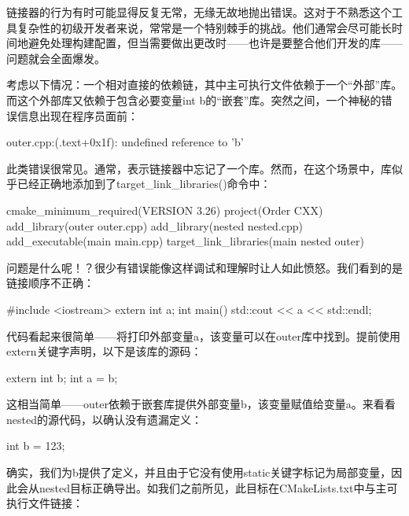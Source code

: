 
链接器的行为有时可能显得反复无常，无缘无故地抛出错误。这对于不熟悉这个工具复杂性的初级开发者来说，常常是一个特别棘手的挑战。他们通常会尽可能长时间地避免处理构建配置，但当需要做出更改时——也许是要整合他们开发的库——问题就会全面爆发。

考虑以下情况：一个相对直接的依赖链，其中主可执行文件依赖于一个“外部”库。而这个外部库又依赖于包含必要变量int b的“嵌套”库。突然之间，一个神秘的错误信息出现在程序员面前：

\begin{shell}
outer.cpp:(.text+0x1f): undefined reference to 'b'
\end{shell}

此类错误很常见。通常，表示链接器中忘记了一个库。然而，在这个场景中，库似乎已经正确地添加到了target\_link\_libraries()命令中：


\begin{cmake}
cmake_minimum_required(VERSION 3.26)
project(Order CXX)
add_library(outer outer.cpp)
add_library(nested nested.cpp)
add_executable(main main.cpp)
target_link_libraries(main nested outer)
\end{cmake}

问题是什么呢！？很少有错误能像这样调试和理解时让人如此愤怒。我们看到的是链接顺序不正确：


\begin{cmake}
#include <iostream>
extern int a;
int main() {
    std::cout << a << std::endl;
}
\end{cmake}

代码看起来很简单——将打印外部变量a，该变量可以在outer库中找到。提前使用extern关键字声明，以下是该库的源码：


\begin{cmake}
extern int b;
int a = b;
\end{cmake}

这相当简单——outer依赖于嵌套库提供外部变量b，该变量赋值给变量a。来看看nested的源代码，以确认没有遗漏定义：


\begin{cmake}
int b = 123;
\end{cmake}

确实，我们为b提供了定义，并且由于它没有使用static关键字标记为局部变量，因此会从nested目标正确导出。如我们之前所见，此目标在CMakeLists.txt中与主可执行文件链接：

